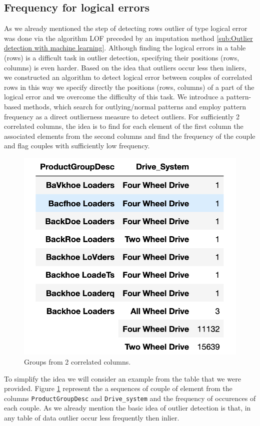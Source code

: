 \documentclass{article}
\begin{document}
\subsection{Frequency for logical errors} %
\label{sub:Frequency for logical errors}
As we already mentioned the step of detecting rows outlier of type logical error was done via the algorithm LOF preceded by an imputation method \ref{sub:Outlier detection with machine learning}.
Although finding the logical errors in a table (rows) is a difficult task in outlier detection, specifying their positions (rows, columns) is even harder.
Based on the idea that outliers occur less then inliers, we constructed an algorithm to detect logical error between couples of correlated rows in this way we specify directly the positions (rows, columns) of a part of the logical error and we overcome the difficulty of this task.
We introduce a pattern-based methods, which search for outlying/normal patterns and employ pattern frequency as a direct outlierness measure to detect outliers.
For sufficiently 2 correlated columns, the idea is to find for each element of the first column the associated elements from the second columns and find the frequency of the couple and flag couples with sufficiently low frequency.
\begin{figure}[H]
    \centering
    \includegraphics[width=0.6\linewidth]{picture/logic_err.png}
    \caption{Groups from 2 correlated columns.}
    \label{fig:logic_err}
\end{figure}
To simplify the idea we will consider an example from the table that we were provided. Figure \ref{fig:logic_err} represent the a sequences of couple of element from the columns \texttt{ProductGroupDesc} and \texttt{Drive\_system} and the frequency of occurences of each couple.
As we already mention the basic idea of outlier detection is that, in any table of data outlier occur less frequently then inlier.
\end{document}
